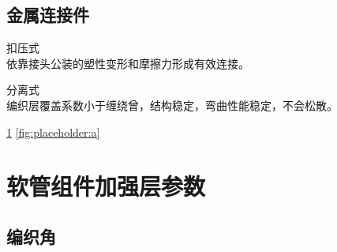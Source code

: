 \subsection{金属连接件}
	\begin{asparaenum}
		\item 扣压式\\
		依靠接头公装的塑性变形和摩擦力形成有效连接。
		\item 分离式\\
		编织层覆盖系数小于缠绕曾，结构稳定，弯曲性能稳定，不会松散。
		
		\ref{fig:placeholder}
		\ref{fig:placeholder:a}
		\begin{figure}[!htbp]
			\centering
			\hspace{1cm}
			\label{fig:placeholder}
		\end{figure}
	\end{asparaenum}	
	





	




\section{软管组件加强层参数}
\label{sec:parameter}



\subsection{编织角}


